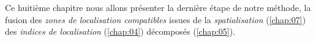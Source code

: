 Ce huitième chapitre nous allons présenter la dernière étape de notre
méthode, la fusion des \emph{zones de localisation compatibles} issues
de la \emph{spatialisation} (\autoref{chap:07}) des \emph{indices de
  localisation} (\autoref{chap:04}) décomposés (\autoref{chap:05}).

